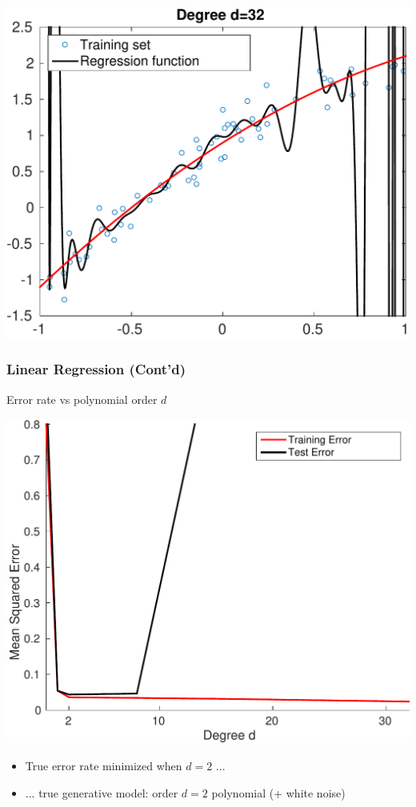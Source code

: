 \documentclass[compress, smaller, serif, 9pt]{beamer}
\begin{document}
\begin{frame}
\begin{center}
    \includegraphics[width=.33\textwidth]{regression_order_regul_32_en.pdf}
    \end{center}
\end{frame}

\begin{frame}
  \frametitle{Linear Regression (Cont'd)}
  \begin{block}{Error rate vs polynomial order $d$}
  \end{block}
  \begin{center}
    \includegraphics[width=.6\textwidth]{erreur_reg_vs_order_en.pdf}
  \end{center}
    \begin{itemize}
  \item True error rate minimized when $d=2$ ...
   \item ... true generative model: order $d=2$ polynomial (+ white noise)
  \end{itemize}
\end{frame}
\end{document}
